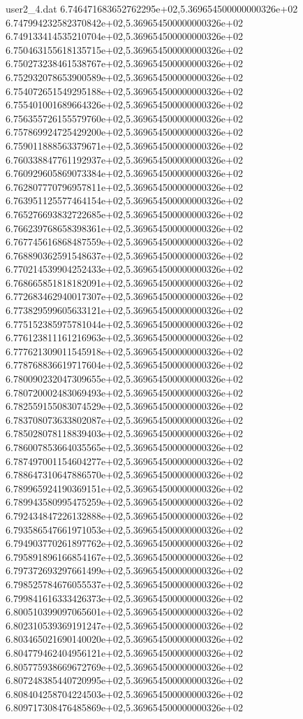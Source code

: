 \begin{filecontents}{user2_4.dat}
6.746471683652762295e+02,5.369654500000000326e+02
6.747994232582370842e+02,5.369654500000000326e+02
6.749133414535210704e+02,5.369654500000000326e+02
6.750463155618135715e+02,5.369654500000000326e+02
6.750273238461538767e+02,5.369654500000000326e+02
6.752932078653900589e+02,5.369654500000000326e+02
6.754072651549295188e+02,5.369654500000000326e+02
6.755401001689664326e+02,5.369654500000000326e+02
6.756355726155579760e+02,5.369654500000000326e+02
6.757869924725429200e+02,5.369654500000000326e+02
6.759011888563379671e+02,5.369654500000000326e+02
6.760338847761192937e+02,5.369654500000000326e+02
6.760929605869073384e+02,5.369654500000000326e+02
6.762807770796957811e+02,5.369654500000000326e+02
6.763951125577464154e+02,5.369654500000000326e+02
6.765276693832722685e+02,5.369654500000000326e+02
6.766239768658398361e+02,5.369654500000000326e+02
6.767745616868487559e+02,5.369654500000000326e+02
6.768890362591548637e+02,5.369654500000000326e+02
6.770214539904252433e+02,5.369654500000000326e+02
6.768665851818182091e+02,5.369654500000000326e+02
6.772683462940017307e+02,5.369654500000000326e+02
6.773829599605633121e+02,5.369654500000000326e+02
6.775152385975781044e+02,5.369654500000000326e+02
6.776123811161216963e+02,5.369654500000000326e+02
6.777621309011545918e+02,5.369654500000000326e+02
6.778768836619717604e+02,5.369654500000000326e+02
6.780090232047309655e+02,5.369654500000000326e+02
6.780720002483069493e+02,5.369654500000000326e+02
6.782559155083074529e+02,5.369654500000000326e+02
6.783708073633802087e+02,5.369654500000000326e+02
6.785028078118839403e+02,5.369654500000000326e+02
6.786007853664035565e+02,5.369654500000000326e+02
6.787497001154604277e+02,5.369654500000000326e+02
6.788647310647886570e+02,5.369654500000000326e+02
6.789965924190369151e+02,5.369654500000000326e+02
6.789943580995475259e+02,5.369654500000000326e+02
6.792434847226132888e+02,5.369654500000000326e+02
6.793586547661971053e+02,5.369654500000000326e+02
6.794903770261897762e+02,5.369654500000000326e+02
6.795891896166854167e+02,5.369654500000000326e+02
6.797372693297661499e+02,5.369654500000000326e+02
6.798525784676055537e+02,5.369654500000000326e+02
6.799841616333426373e+02,5.369654500000000326e+02
6.800510399097065601e+02,5.369654500000000326e+02
6.802310539369191247e+02,5.369654500000000326e+02
6.803465021690140020e+02,5.369654500000000326e+02
6.804779462404956121e+02,5.369654500000000326e+02
6.805775938669672769e+02,5.369654500000000326e+02
6.807248385440720995e+02,5.369654500000000326e+02
6.808404258704224503e+02,5.369654500000000326e+02
6.809717308476485869e+02,5.369654500000000326e+02

\end{filecontents}
